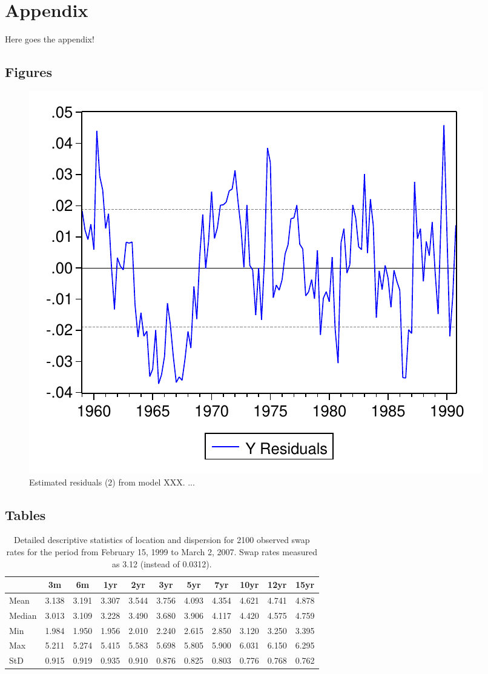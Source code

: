 \documentclass[a4paper,11pt]{article}
\begin{document}
\newpage

\appendix

\hypertarget{appendix}{%
\section{Appendix}\label{appendix}}

Here goes the appendix!

\hypertarget{figures}{%
\subsection{Figures}\label{figures}}
\begin{figure}

{\centering \includegraphics[width=0.5\linewidth,]{figures/graph} 

}

\caption{Estimated residuals (2) from model XXX. ...}\label{fig:graph2}
\end{figure}
\hypertarget{tables}{%
\subsection{Tables}\label{tables}}
\begin{table}[ht]
    \begin{center}
        {\footnotesize
        \begin{tabular}{l|cccccccccc}
        \hline \hline
                        & 3m    & 6m    & 1yr   & 2yr   & 3yr   & 5yr   & 7yr   & 10yr  & 12yr  & 15yr   \\
            \hline
                Mean   & 3.138 & 3.191 & 3.307 & 3.544 & 3.756 & 4.093 & 4.354 & 4.621 & 4.741 & 4.878  \\
                Median & 3.013 & 3.109 & 3.228 & 3.490 & 3.680 & 3.906 & 4.117 & 4.420 & 4.575 & 4.759  \\
                Min    & 1.984 & 1.950 & 1.956 & 2.010 & 2.240 & 2.615 & 2.850 & 3.120 & 3.250 & 3.395  \\
                Max    & 5.211 & 5.274 & 5.415 & 5.583 & 5.698 & 5.805 & 5.900 & 6.031 & 6.150 & 6.295  \\
                StD    & 0.915 & 0.919 & 0.935 & 0.910 & 0.876 & 0.825 & 0.803 & 0.776 & 0.768 & 0.762  \\
            \hline \hline
        \end{tabular}}
    \end{center}
    \caption{Detailed descriptive statistics of location and dispersion for
    2100 observed swap rates for the period from
    February 15, 1999 to March 2, 2007. Swap rates measured as 3.12 (instead of 0.0312).}
    \label{tab:apptable}
\end{table}
\end{document}
